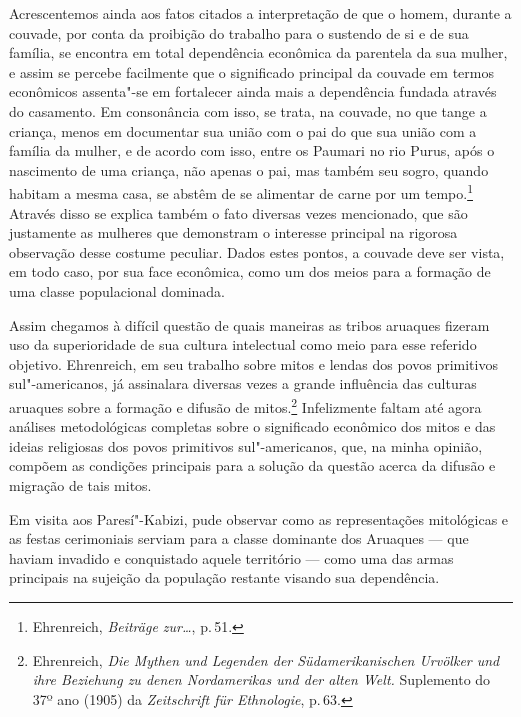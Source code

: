 Acrescentemos ainda aos fatos citados a interpretação de que o homem,
durante a couvade, por conta da proibição do trabalho para o sustendo
de si e de sua família, se encontra em total dependência econômica da
parentela da sua mulher, e assim se percebe facilmente que o
significado principal da couvade em termos econômicos assenta"-se em
fortalecer ainda mais a dependência fundada através do casamento. Em
consonância com isso, se trata, na couvade, no que tange a criança, menos
em documentar sua união com o pai do que sua união com a família da
mulher, e de acordo com isso, entre os Paumari no rio Purus, após o
nascimento de uma criança, não apenas o pai, mas também seu sogro,
quando habitam a mesma casa, se abstêm de se alimentar de carne por
um tempo.\footnote{Ehrenreich, \textit{Beiträge zur\ldots}, p.\,51.} Através disso se explica também o fato diversas vezes
mencionado, que são justamente as mulheres que demonstram o interesse
principal na rigorosa observação desse costume peculiar. Dados estes pontos, 
a couvade deve ser vista, em todo caso, por sua face econômica,
como um dos meios para a formação de uma classe populacional dominada.

Assim chegamos à difícil questão de quais maneiras as tribos aruaques
fizeram uso da superioridade de sua cultura intelectual como meio para
esse referido objetivo. Ehrenreich, em seu trabalho sobre mitos e lendas
dos povos primitivos sul"-americanos, já assinalara diversas vezes a
grande influência das culturas aruaques sobre a formação e difusão de
mitos.\footnote{Ehrenreich, \textit{Die Mythen und Legenden der
  Südamerikanischen Urvölker und ihre Beziehung zu denen Nordamerikas
  und der alten Welt.} Suplemento do 37º ano (1905) da \textit{Zeitschrift
  für Ethnologie}, p.\,63.} Infelizmente faltam até agora análises 
  metodológicas completas sobre o significado econômico dos mitos e das
ideias religiosas dos povos primitivos sul"-americanos, que, na minha
opinião, compõem as condições principais para a solução da questão
acerca da difusão e migração de tais mitos.

Em visita aos Paresí"-Kabizi, pude observar como as
representações mitológicas e as festas cerimoniais serviam para a
classe dominante dos Aruaques --- que haviam invadido e conquistado
aquele território --- como uma das armas principais na sujeição da
população restante visando sua dependência.

